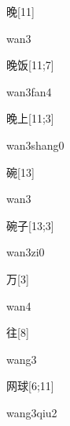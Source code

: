 \begin{verbete}[wan3]{晚}[11]
\begin{pronuncia}{wan3}
\end{pronuncia}
\end{verbete}

\begin{verbete}{晚饭}[11;7]
\begin{pronuncia}{wan3fan4}
\end{pronuncia}
\end{verbete}

\begin{verbete}{晚上}[11;3]
\begin{pronuncia}{wan3shang0}
\end{pronuncia}
\end{verbete}

\begin{verbete}[wan3]{碗}[13]
\begin{pronuncia}{wan3}
\end{pronuncia}
\end{verbete}

\begin{verbete}[wan3zi0]{碗子}[13;3]
\begin{pronuncia}{wan3zi0}
\end{pronuncia}
\end{verbete}

\begin{verbete}[wan4]{万}[3]
\begin{pronuncia}{wan4}
\end{pronuncia}
\end{verbete}

\begin{verbete}[wang3]{往}[8]
\begin{pronuncia}{wang3}
\end{pronuncia}
\end{verbete}

\begin{verbete}{网球}[6;11]
\begin{pronuncia}{wang3qiu2}
\end{pronuncia}
\end{verbete}

